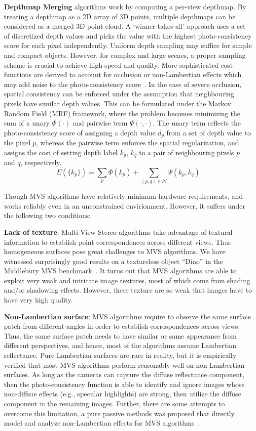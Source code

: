 \textbf{Depthmap Merging} algorithms work by computing a per-view depthmap. By treating a depthmap as a 2D array of 3D points, multiple depthmaps can be considered as a merged 3D point cloud. A `winner-takes-all' approach uses a set of discretized depth values and picks the value with the highest photo-consistency score for each pixel independently. Uniform depth sampling may suffice for simple and compact objects. However, for complex and large scenes, a proper sampling scheme is crucial to achieve high speed and quality. More sophisticated cost functions are derived to account for occlusion or non-Lambertian effects which may add noise to the photo-consistency score~\cite{goesele2006multi,vogiatzis2007multiview}. In the case of severe occlusion, spatial consistency can be enforced under the assumption that neighbouring pixels have similar depth values. This can be formulated under the Markov Random Field (MRF) framework, where the problem becomes minimizing the sum of a unary $\Phi(\cdot)$ and pairwise term $\Psi(\cdot, \cdot)$. The unary term reflects the photo-consistency score of assigning a depth value $d_p$ from a set of depth value to the pixel $p$, whereas the pairwise term enforces the spatial regularization, and assigns the cost of setting depth label $k_p$, $k_q$ to a pair of neighbouring pixels $p$ and $q$, respectively.
$$
E(\{k_p\})= \sum_p \Phi(k_p) + \sum_{(p,q)\in\mathcal{N}}\Psi(k_p, k_q)
$$

Though MVS algorithms have relatively minimum hardware requirements, and works reliably even in an unconstrained envirionment. However, it suffers under the following two conditions:

\textbf{Lack of texture}: Multi-View Stereo algorithms take advantage of textural information to establish point correspondences across different views. Thus homogeneous surfaces pose great challenges to MVS algorithms. We have witnessed surprisingly good results on a textureless object ``Dino'' in the Middlebury MVS benchmark~\cite{seitz2006comparison}. It turns out that MVS algorithms are able to exploit very weak and intricate image textures, most of which come from shading and/or shadowing effects. However, these texture are so weak that images have to have very high quality.

\textbf{Non-Lambertian surface}: MVS algorithms require to observe the same surface patch from different angles in order to establish correspondences across views. Thus, the same surface patch needs to have similar or same appearance from different perspectives, and hence, most of the algorithms assume Lambertian reflectance. Pure Lambertian surfaces are rare in reality, but it is empirically verified that most MVS algorithms perform reasonably well on non-Lambertian surfaces. As long as the cameras can capture the diffuse reflectance component, then the photo-consistency function is able to identify and ignore images whose non-diffsue effects (e.g., specular highlights) are strong, then utilize the diffuse component in the remaining images. Further, there are some attempts to overcome this limitation, a pure passive methods was proposed that directly model and analyze non-Lambertian effects for MVS algorithms~\cite{jin2003multi,jin2005multi}.

